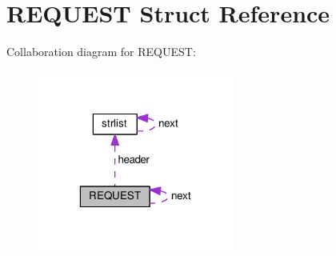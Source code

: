 \hypertarget{structREQUEST}{}\section{R\+E\+Q\+U\+E\+ST Struct Reference}
\label{structREQUEST}


Collaboration diagram for R\+E\+Q\+U\+E\+ST\+:
\nopagebreak
\begin{figure}[H]
\begin{center}
\leavevmode
\includegraphics[width=184pt]{structREQUEST__coll__graph}
\end{center}
\end{figure}
